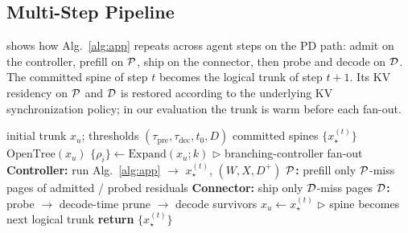 \subsection{Multi-Step Pipeline}
\label{sec:pipeline}
 shows how Alg.~\ref{alg:app} repeats across agent steps on the PD path: admit on the controller, prefill on $\mathcal{P}$, ship on the connector, then probe and decode on $\mathcal{D}$.
The committed spine of step $t$ becomes the logical trunk of step $t{+}1$.
Its KV residency on $\mathcal{P}$ and $\mathcal{D}$ is restored according to the underlying KV synchronization policy; in our evaluation the trunk is warm before each fan-out.

\begin{algorithm}[t]
\caption{\sys{} multi-step pipeline.
Each step invokes Alg.~\ref{alg:app}.}
\label{alg:pipeline}
\small
\begin{algorithmic}[1]
\REQUIRE initial trunk $x_u$; thresholds $(\tau_{\mathrm{pre}},\tau_{\mathrm{dec}},t_0,D)$
\ENSURE committed spines $\{x_\star^{(t)}\}$
\STATE $\mathrm{OpenTree}(x_u)$
  \STATE $\{\rho_i\}\leftarrow\mathrm{Expand}(x_u;k)$ \hfill \(\triangleright\) branching-controller fan-out
  \STATE \textbf{Controller:} run Alg.~\ref{alg:app} $\to$ $x_\star^{(t)}$, $(W,X,D^{+})$
  \STATE \textbf{$\mathcal{P}$:} prefill only $\mathcal{P}$-miss pages of admitted / probed residuals
  \STATE \textbf{Connector:} ship only $\mathcal{D}$-miss pages
  \STATE \textbf{$\mathcal{D}$:} probe $\to$ decode-time prune $\to$ decode survivors
  \STATE $x_u\leftarrow x_\star^{(t)}$ \hfill \(\triangleright\) spine becomes next logical trunk
\ENDFOR
\STATE \textbf{return} $\{x_\star^{(t)}\}$
\end{algorithmic}
\end{algorithm}
